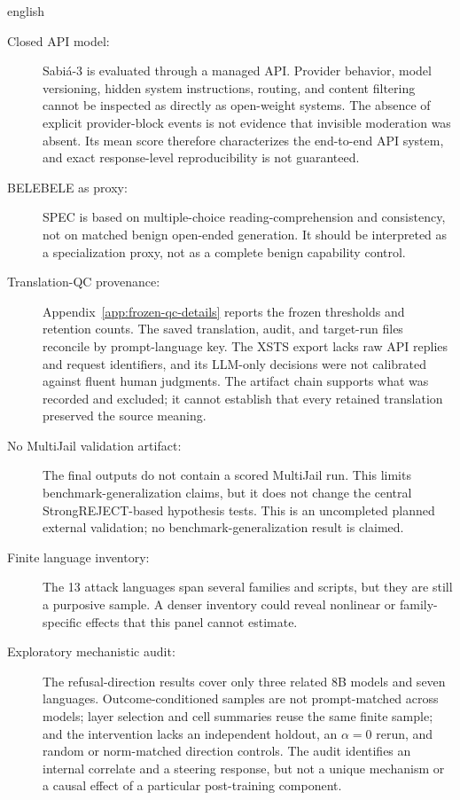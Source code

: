 \begin{otherlanguage*}{english}
\begin{description}
    \item[Closed API model:] Sabiá-3 is evaluated through a managed API. Provider behavior, model versioning, hidden system instructions, routing, and content filtering cannot be inspected as directly as open-weight systems. The absence of explicit provider-block events is not evidence that invisible moderation was absent. Its mean score therefore characterizes the end-to-end API system, and exact response-level reproducibility is not guaranteed.

    \item[BELEBELE as proxy:] SPEC is based on multiple-choice reading-comprehension and consistency, not on matched benign open-ended generation. It should be interpreted as a specialization proxy, not as a complete benign capability control.

    \item[Translation-QC provenance:] Appendix~\ref{app:frozen-qc-details} reports the frozen thresholds and retention counts. The saved translation, audit, and target-run files reconcile by prompt-language key. The XSTS export lacks raw API replies and request identifiers, and its LLM-only decisions were not calibrated against fluent human judgments. The artifact chain supports what was recorded and excluded; it cannot establish that every retained translation preserved the source meaning.

    \item[No MultiJail validation artifact:] The final outputs do not contain a scored MultiJail run. This limits benchmark-generalization claims, but it does not change the central StrongREJECT-based hypothesis tests. This is an uncompleted planned external validation; no benchmark-generalization result is claimed.

    \item[Finite language inventory:] The 13 attack languages span several families and scripts, but they are still a purposive sample. A denser inventory could reveal nonlinear or family-specific effects that this panel cannot estimate.

    \item[Exploratory mechanistic audit:] The refusal-direction results cover only three related 8B models and seven languages. Outcome-conditioned samples are not prompt-matched across models; layer selection and cell summaries reuse the same finite sample; and the intervention lacks an independent holdout, an $\alpha=0$ rerun, and random or norm-matched direction controls. The audit identifies an internal correlate and a steering response, but not a unique mechanism or a causal effect of a particular post-training component.
\end{description}

\end{otherlanguage*}
